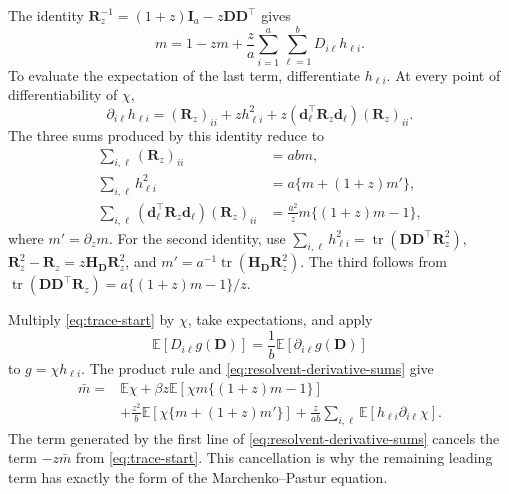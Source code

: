\documentclass[11pt]{article}
\newcommand{\trans}{\top}
\DeclareMathOperator{\tr}{tr}
\begin{document}
The identity
$\bm R_z^{-1}=(1+z)\bm I_a-z\bm D\bm D^\trans$ gives
\begin{equation}
\label{eq:trace-start}
  m
  =
  1-zm
  +
  \frac za
  \sum_{i=1}^a\sum_{\ell=1}^b
  D_{i\ell}h_{\ell i}.
\end{equation}
To evaluate the expectation of the last term, differentiate
$h_{\ell i}$. At every point of differentiability of $\chi$,
\[
  \partial_{i\ell}h_{\ell i}
  =
  (\bm R_z)_{ii}
  +
  zh_{\ell i}^2
  +
  z
  (\bm d_\ell^\trans\bm R_z\bm d_\ell)
  (\bm R_z)_{ii}.
\]
The three sums produced by this identity reduce to
\begin{equation}
\label{eq:resolvent-derivative-sums}
\begin{aligned}
  \sum_{i,\ell}(\bm R_z)_{ii}
  &=abm,\\
  \sum_{i,\ell}h_{\ell i}^2
  &=a\{m+(1+z)m'\},\\
  \sum_{i,\ell}
  (\bm d_\ell^\trans\bm R_z\bm d_\ell)
  (\bm R_z)_{ii}
  &=
  \frac{a^2}{z}
  m\{(1+z)m-1\},
\end{aligned}
\end{equation}
where $m'=\partial_zm$. For the second identity, use
$\sum_{i,\ell}h_{\ell i}^2
=\tr(\bm D\bm D^\trans\bm R_z^2)$,
$\bm R_z^2-\bm R_z=z\bm H_{\bm D}\bm R_z^2$, and
$m'=a^{-1}\tr(\bm H_{\bm D}\bm R_z^2)$. The third follows from
$\tr(\bm D\bm D^\trans\bm R_z)
=a\{(1+z)m-1\}/z$.

Multiply \cref{eq:trace-start} by $\chi$, take expectations, and apply
\[
  \mathbb E[D_{i\ell}g(\bm D)]
  =
  \frac1b\mathbb E[\partial_{i\ell}g(\bm D)]
\]
to $g=\chi h_{\ell i}$. The product rule and
\cref{eq:resolvent-derivative-sums} give
\begin{equation}
\label{eq:localized-loop}
\begin{aligned}
  \bar m
  ={}&
  \mathbb E\chi
  +
  \beta z
  \mathbb E\left[
    \chi m\{(1+z)m-1\}
  \right] \\
  &+
  \frac{z^2}{b}
  \mathbb E\left[
    \chi\{m+(1+z)m'\}
  \right]
  +
  \frac{z}{ab}
  \sum_{i,\ell}
  \mathbb E\left[
    h_{\ell i}\partial_{i\ell}\chi
  \right].
\end{aligned}
\end{equation}
The term generated by the first line of
\cref{eq:resolvent-derivative-sums} cancels the term $-z\bar m$ from
\cref{eq:trace-start}. This cancellation is why the remaining leading term
has exactly the form of the Marchenko--Pastur equation.
\end{document}
